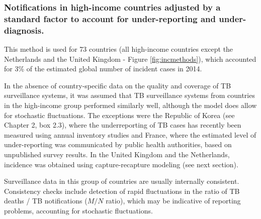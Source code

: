 \subsubsection {Notifications in high-income countries adjusted by a standard factor to account for under-reporting and under-diagnosis.} This method is used for 73 countries (all high-income countries except the Netherlands and the United Kingdom - Figure \ref{fig:incmethods}), which accounted for 3\% of the estimated global number of incident cases in 2014.

In the absence of country-specific data on the quality and coverage of TB surveillance systems, it was assumed that TB surveillance systems from countries in the high-income group performed similarly well, although the model does allow for stochastic fluctuations. The exceptions were the Republic of Korea (see Chapter 2, box 2.3), where the underreporting of TB cases has recently been measured using annual inventory studies and France, where the estimated level of under-reporting was communicated by public health authorities, based on unpublished survey results. In the United Kingdom and the Netherlands, incidence was obtained using capture-recapture modeling (see next section).

Surveillance data in this group of countries are usually internally consistent. Consistency checks include detection of rapid fluctuations in the ratio of TB deaths / TB notifications ($M/N$ ratio), which may be indicative of reporting problems, accounting for stochastic fluctuations.



